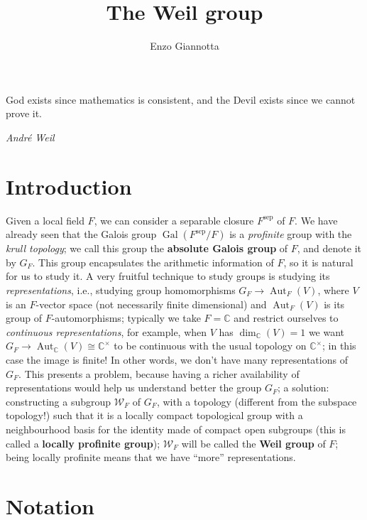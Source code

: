 \documentclass[12pt]{article}
\title{The Weil group}
\author{Enzo Giannotta}
\theoremstyle{plain}
\theoremstyle{definition}
\newcommand{\complex}{\mathbb{C}}
\newcommand{\Gal}[2]{\operatorname{Gal} ( #1 / #2 )}
\newcommand{\sep}[1]{{#1}^{\operatorname{sep}}}
\newcommand{\weil}[1]{\mathcal W_{#1}}
\begin{document}
\maketitle


\tableofcontents

\epigraph{God exists since mathematics is consistent, and the Devil exists since we cannot prove it.}{\textit{André Weil}}



\section{Introduction}

Given a local field $F$, we can consider a separable closure $\sep F$ of $F$. We have already seen that the Galois group $\Gal { \sep F} F$ is a \textit{profinite} group with the \textit{krull topology}; we call this group the \textbf{absolute Galois group} of $F$, and denote it by $G_F$. This group encapsulates the arithmetic information of $F$, so it is natural for us to study it. A very fruitful technique to study groups is studying its \textit{representations}, i.e., studying group homomorphisms $G_F \to \operatorname{Aut}_F (V)$, where $V$ is an $F$-vector space (not necessarily finite dimensional) and $\operatorname{Aut}_F (V)$ is its group of $F$-automorphisms; typically we take $F = \complex$ and restrict ourselves to \textit{continuous representations}, for example, when $V$ has $\dim_{\complex} (V) = 1$ we want $G_F \to \operatorname{Aut}_\complex (V) \cong \complex^\times$ to be continuous with the usual topology on $\complex^\times$; in this case the image is finite! In other words, we don't have many representations of $G_F$. This presents a problem, because having a richer availability of representations would help us understand better the group $G_F$; a solution: constructing a subgroup $\weil F$ of $G_F$, with a topology (different from the subspace topology!) such that it is a locally compact topological group with a neighbourhood basis for the identity made of compact open subgroups (this is called a \textbf{locally profinite group}); $\weil F$ will be called the \textbf{Weil group} of $F$; being locally profinite means that we have ``more'' representations.

\section{Notation}
\end{document}
